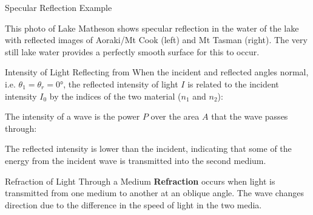 \documentclass[12pt,compress,aspectratio=169]{beamer}
\begin{document}
\begin{frame}{Specular Reflection Example}
  \begin{center}
  \end{center}
  This photo of Lake Matheson shows specular reflection in the water of the
  lake with reflected images of Aoraki/Mt Cook (left) and Mt Tasman (right).
  The very still lake water provides a perfectly smooth surface for this to
  occur.
\end{frame}


\begin{frame}{Intensity of Light Reflecting from}
  When the incident and reflected angles normal, i.e.
  $\theta_1=\theta_r=\ang{0}$, the reflected intensity of light $I$ is related
  to the incident intensity $I_0$ by the indices of the two material ($n_1$ and
  $n_2$):

  
  The intensity of a wave is the power $P$ over the area $A$ that the wave
  passes through:


  The reflected intensity is lower than the incident, indicating that some of
  the energy from the incident wave is transmitted into the second medium.
\end{frame}



\begin{frame}{Refraction of Light Through a Medium}
  \textbf{Refraction} occurs when light is transmitted from one medium to
  another at an oblique angle. The wave changes direction due to the difference
  in the speed of light in the two media.
  \begin{center}
  \end{center}
\end{frame}
\end{document}
